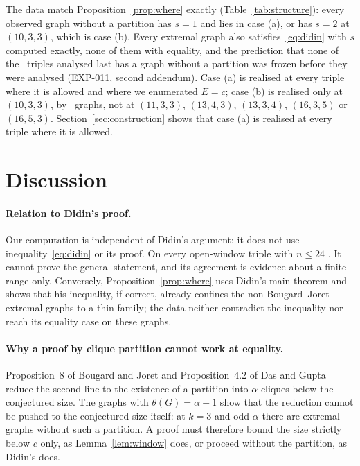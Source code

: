\documentclass[11pt]{article}
\theoremstyle{definition}
\theoremstyle{remark}
\begin{document}
The data match Proposition~\ref{prop:where} exactly (Table~\ref{tab:structure}): every observed graph without a
partition has $s=1$ and lies in case (a), or has $s=2$ at $(10,3,3)$, which is case (b). Every extremal graph also
satisfies~\eqref{eq:didin} with $s$ computed exactly, none of them with equality, and the prediction that none of the
\nphasetwotriples\ triples analysed last has a graph without a partition was frozen before they were analysed
(EXP-011, second addendum). Case (a) is realised at every triple where it is allowed and where we enumerated $E=c$;
case (b) is realised only at $(10,3,3)$, by \ntenthreeb\ graphs, not at $(11,3,3)$, $(13,4,3)$, $(13,3,4)$,
$(16,3,5)$ or $(16,5,3)$. Section~\ref{sec:construction} shows that case (a) is realised at every triple where it
is allowed.




\section{Discussion}\label{sec:discussion}

\paragraph{Relation to Didin's proof.} Our computation is independent of Didin's argument: it does not use
inequality~\eqref{eq:didin} or its proof. On every open-window triple with $n\le24$ \independentphrase. It cannot
prove the general statement, and its agreement is evidence about a finite range only. Conversely,
Proposition~\ref{prop:where} uses Didin's main theorem and shows that his inequality, if correct, already confines the
non-Bougard--Joret extremal graphs to a thin family; the data neither contradict the inequality nor reach its equality
case on these graphs.

\paragraph{Why a proof by clique partition cannot work at equality.} Proposition~8 of Bougard and Joret and
Proposition~4.2 of Das and Gupta reduce the second line to the existence of a partition into $\alpha$ cliques below
the conjectured size. The graphs with $\theta(G)=\alpha+1$ show that the reduction cannot be pushed to the conjectured
size itself: at $k=3$ and odd $\alpha$ there are extremal graphs without such a partition. A proof must therefore bound
the size strictly below $c$ only, as Lemma~\ref{lem:window} does, or proceed without the partition, as Didin's does.
\end{document}
